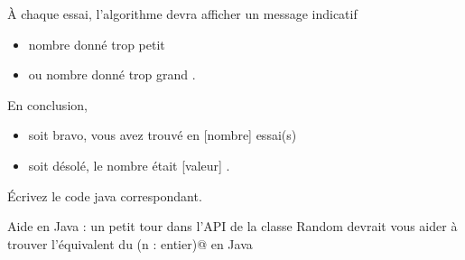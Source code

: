 \documentclass[11pt,a4paper]{article}
\begin{document}
          \`A chaque essai, l'algorithme devra afficher un message indicatif
          
					\begin{itemize}
				
			\item \guillemotleft  nombre donn\'e trop petit \guillemotright 
			\item ou \guillemotleft  nombre donn\'e trop grand \guillemotright . 
					\end{itemize}
				
          En conclusion, 
          
					\begin{itemize}
				
			\item soit \guillemotleft  bravo, vous avez trouv\'e en [nombre] essai(s) \guillemotright 
			\item soit \guillemotleft  d\'esol\'e, le nombre \'etait [valeur] \guillemotright .
					\end{itemize}
				
            \par
        \'Ecrivez le code java correspondant.
            \par
        
        Aide en Java : un petit tour dans l'API de la classe Random devrait vous aider \`a trouver l'\'equivalent du
        \verb@hasard(n : entier)@ en Java
    
            \par
        
				
\end{document}
